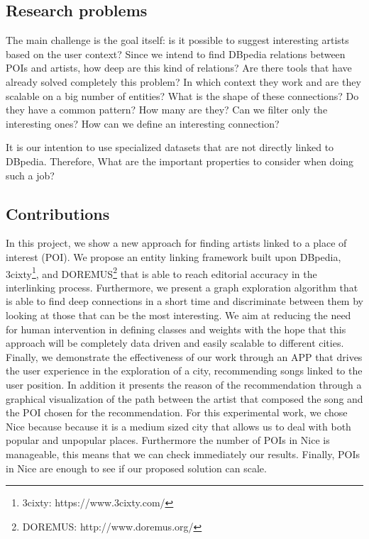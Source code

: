 \documentclass[paper=a4, fontsize=11pt]{scrartcl}
\begin{document}
\subsection{Research problems}
The main challenge is the goal itself: is it possible to suggest interesting artists based on the user context?
Since we intend to find DBpedia relations between POIs and artists, how deep are this kind of relations? Are there tools that have already solved completely this problem? In which context they work and are they scalable on a big number of entities? What is the shape of these connections? Do they have a common pattern? How many are they? Can we filter only the interesting ones? How can we define an interesting connection?

It is our intention to use specialized datasets that are not directly linked to DBpedia. Therefore, What are the important properties to consider when doing such a job? 

\subsection{Contributions}
In this project, we show a new approach for finding artists linked to a place of interest (POI). We propose an entity linking framework built upon DBpedia, 3cixty\footnote{3cixty: https://www.3cixty.com/}, and DOREMUS\footnote{DOREMUS: http://www.doremus.org/} that is able to reach editorial accuracy in the interlinking process. Furthermore, we present a graph exploration algorithm that is able to find deep connections in a short time and discriminate between them by looking at those that can be the most interesting.
We aim at reducing the need for human intervention in defining classes and weights with the hope that this approach will be completely data driven and easily scalable to different cities. 
Finally, we demonstrate the effectiveness of our work through an APP that drives the user experience in the exploration of a city, recommending songs linked to the user position. In addition it presents the reason of the recommendation through a graphical visualization of the path between the artist that composed the song and the POI chosen for the recommendation.
For this experimental work, we chose Nice because because it is a medium sized city that allows us to deal with both popular and unpopular places. Furthermore the number of POIs in Nice is manageable, this means that we can check immediately our results. Finally, POIs in Nice are enough to see if our proposed solution can scale.
\end{document}
